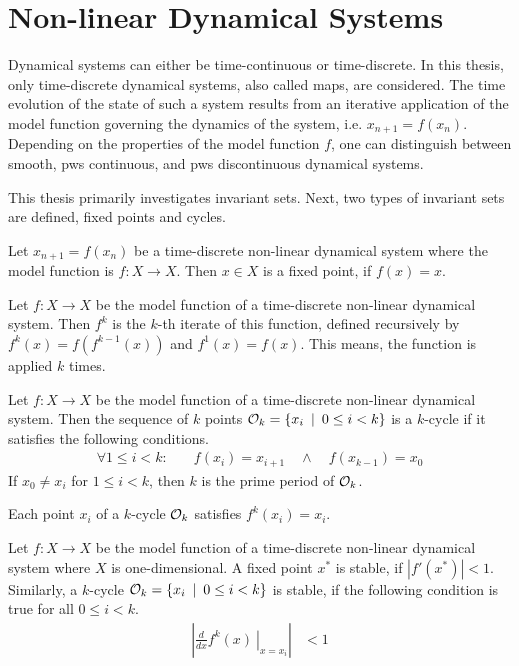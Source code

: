 \section{Non-linear Dynamical Systems}

Dynamical systems can either be time-continuous or time-discrete.
In this thesis, only time-discrete dynamical systems, also called maps, are considered.
The time evolution of the state of such a system results from an iterative application of the model function governing the dynamics of the system, i.e. $x_{n+1} = f(x_n)$.
Depending on the properties of the model function $f$, one can distinguish between smooth, \gls{pws} continuous, and \gls{pws} discontinuous dynamical systems.

This thesis primarily investigates invariant sets.
Next, two types of invariant sets are defined, fixed points and cycles.

\begin{definition}
	Let $x_{n+1} = f(x_n)$ be a time-discrete non-linear dynamical system where the model function is $f: X \to X$.
	Then $x \in X$ is a fixed point, if $f(x) = x$.
\end{definition}

\begin{definition}
	Let $f: X \to X$ be the model function of a time-discrete non-linear dynamical system.
	Then $f^k$ is the $k$-th iterate of this function, defined recursively by $f^k(x) = f\left(f^{k-1}(x)\right)$ and $f^1(x) = f(x)$.
	This means, the function is applied $k$ times.
\end{definition}

\begin{definition}[Cycle]
	Let $f: X \to X$ be the model function of a time-discrete non-linear dynamical system.
	Then the sequence of $k$ points $\mathcal{O}_k = \{x_i \:\mid\: 0 \leq i < k\}$ is a $k$-cycle if it satisfies the following conditions.
	\begin{align}
		\forall 1 \leq i < k: \quad & f(x_i) = x_{i+1} \quad \land \quad f(x_{k-1}) = x_0
	\end{align}
	If $x_0 \neq x_i$ for $1 \leq i < k$, then $k$ is the prime period of $\mathcal{O}_k$.
\end{definition}

Each point $x_i$ of a $k$-cycle $\mathcal{O}_k$ satisfies $f^k(x_i) = x_i$.

\begin{definition}[Stability]
	Let $f: X \to X$ be the model function of a time-discrete non-linear dynamical system where $X$ is one-dimensional.
	A fixed point $x^*$ is stable, if $|f'(x^*)| < 1$.
	Similarly, a $k$-cycle $\mathcal{O}_k = \{x_i \:\mid\: 0 \leq i < k\}$ is stable, if the following condition is true for all $0 \leq i < k$.
	\begin{align}
		\left| \left. \frac{d}{dx}f^k(x) \:\right|_{x = x_i}\right| & < 1
	\end{align}
\end{definition}


